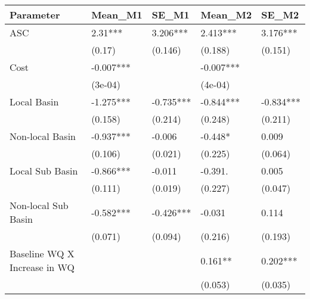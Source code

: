 \begin{table}[ht]
\centering
\begin{tabular}{lllll}
  \hline
Parameter & Mean\_M1 & SE\_M1 & Mean\_M2 & SE\_M2 \\ 
  \hline
ASC & 2.31*** & 3.206*** & 2.413*** & 3.176*** \\ 
   & (0.17) & (0.146) & (0.188) & (0.151) \\ 
  Cost & -0.007*** &  & -0.007*** &  \\ 
   & (3e-04) &  & (4e-04) &  \\ 
  Local Basin & -1.275*** & -0.735*** & -0.844*** & -0.834*** \\ 
   & (0.158) & (0.214) & (0.248) & (0.211) \\ 
  Non-local Basin & -0.937*** & -0.006 & -0.448* & 0.009 \\ 
   & (0.106) & (0.021) & (0.225) & (0.064) \\ 
  Local Sub Basin & -0.866*** & -0.011 & -0.391. & 0.005 \\ 
   & (0.111) & (0.019) & (0.227) & (0.047) \\ 
  Non-local Sub Basin & -0.582*** & -0.426*** & -0.031 & 0.114 \\ 
   & (0.071) & (0.094) & (0.216) & (0.193) \\ 
  Baseline WQ X Increase in WQ &  &  & 0.161** & 0.202*** \\ 
   &  &  & (0.053) & (0.035) \\ 
   \hline
\end{tabular}
\end{table}
